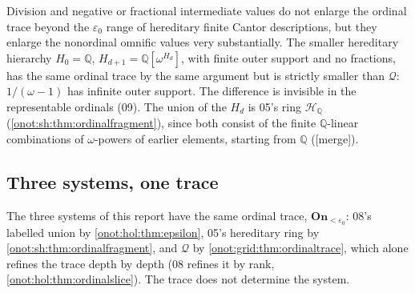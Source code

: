 \documentclass[11pt,oneside]{article}
\numberwithin{equation}{section}
\theoremstyle{definition}
\theoremstyle{remark}
\newcommand{\On}{\mathbf{On}}
\newcommand{\Q}{\mathbb Q}
\newcommand{\Hh}{\mathcal H}
\newcommand{\QO}{\mathcal Q}
\newcommand{\mergetag}{\textup{\textsf{\small[merge]}}}
\begin{document}
Division and negative or fractional intermediate values do not enlarge the
ordinal trace beyond the $\varepsilon_0$ range of hereditary finite Cantor
descriptions, but they enlarge the nonordinal omnific values very substantially.
The smaller hereditary hierarchy $H_0=\Q$, $H_{d+1}=\Q[\omega^{H_d}]$, with finite
outer support and no fractions, has the same ordinal trace by the same argument
but is strictly smaller than $\QO$: $1/(\omega-1)$ has infinite outer support. The
difference is invisible in the representable ordinals (09). The union of the
$H_d$ is 05's ring $\Hh_\Q$ (\cref{onot:sh:thm:ordinalfragment}), since both
consist of the finite $\Q$-linear combinations of $\omega$-powers of earlier
elements, starting from $\Q$ (\mergetag).

\subsection{Three systems, one trace}

The three systems of this report have the same ordinal trace,
$\On_{<\varepsilon_0}$: 08's labelled union by \cref{onot:hol:thm:epsilon}, 05's
hereditary ring by \cref{onot:sh:thm:ordinalfragment}, and $\QO$ by
\cref{onot:grid:thm:ordinaltrace}, which alone refines the trace depth by depth
(08 refines it by rank, \cref{onot:hol:thm:ordinalslice}). The trace does not
determine the system.
\end{document}
